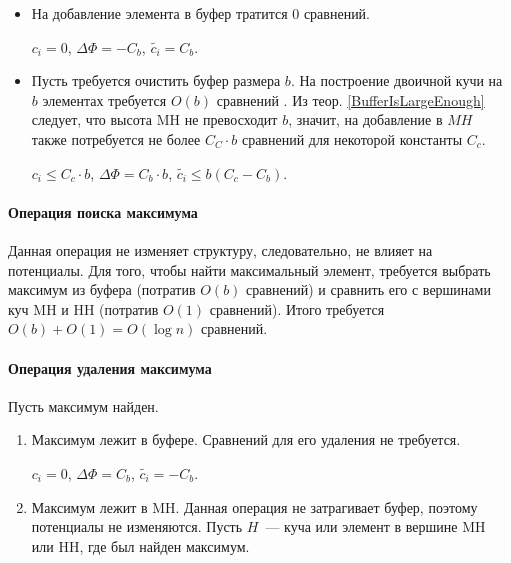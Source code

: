 \begin{itemize}
\item На добавление элемента в буфер тратится 0 сравнений.

$c_i = 0$, $\Delta\Phi = -C_b$, $\tilde{c_i} = C_b$.
\item Пусть требуется очистить буфер размера $b$. На построение двоичной кучи на $b$ элементах требуется
$O(b)$ сравнений . Из теор. \ref{BufferIsLargeEnough}
следует, что высота MH не превосходит $b$, значит, на добавление в $MH$
также потребуется не более $C_C\cdot b$ сравнений для некоторой константы $C_c$.

$c_i \leq C_c \cdot b$, $\Delta\Phi = C_b \cdot b$, $\tilde{c_i} \leq b(C_c - C_b)$.
\end{itemize}

\paragraph{Операция поиска максимума}
Данная операция не изменяет структуру, следовательно, не влияет на потенциалы. Для того,
чтобы найти максимальный элемент, требуется выбрать максимум из буфера (потратив $O(b)$ сравнений)
и сравнить его с вершинами куч MH и HH (потратив $O(1)$ сравнений). Итого требуется $O(b) + O(1) = O(\log n)$
сравнений.

\paragraph{Операция удаления максимума}
Пусть максимум найден.
\begin{enumerate}
\item Максимум лежит в буфере. Сравнений для его удаления не требуется.

$c_i = 0$, $\Delta\Phi = C_b$, $\tilde{c_i} = -C_b$.
\item Максимум лежит в MH. Данная операция не затрагивает буфер, поэтому
потенциалы не изменяются. Пусть $H$~--- куча или элемент в вершине MH или HH, где был найден
максимум.
\end{enumerate}
